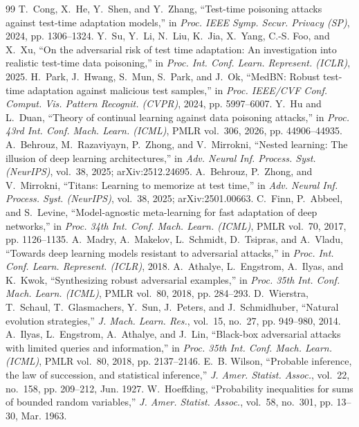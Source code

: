 \documentclass[journal]{IEEEtran}
\theoremstyle{remark}
\begin{document}
\begin{thebibliography}{99}
 T.~Cong, X.~He, Y.~Shen, and Y.~Zhang, ``Test-time poisoning attacks against test-time adaptation models,'' in \emph{Proc. IEEE Symp. Secur. Privacy (SP)}, 2024, pp. 1306--1324.
 Y.~Su, Y.~Li, N.~Liu, K.~Jia, X.~Yang, C.-S. Foo, and X.~Xu, ``On the adversarial risk of test time adaptation: An investigation into realistic test-time data poisoning,'' in \emph{Proc. Int. Conf. Learn. Represent. (ICLR)}, 2025.
 H.~Park, J.~Hwang, S.~Mun, S.~Park, and J.~Ok, ``MedBN: Robust test-time adaptation against malicious test samples,'' in \emph{Proc. IEEE/CVF Conf. Comput. Vis. Pattern Recognit. (CVPR)}, 2024, pp. 5997--6007.
 Y.~Hu and L.~Duan, ``Theory of continual learning against data poisoning attacks,'' in \emph{Proc. 43rd Int. Conf. Mach. Learn. (ICML)}, PMLR vol.~306, 2026, pp. 44906--44935.
 A.~Behrouz, M.~Razaviyayn, P.~Zhong, and V.~Mirrokni, ``Nested learning: The illusion of deep learning architectures,'' in \emph{Adv. Neural Inf. Process. Syst. (NeurIPS)}, vol.~38, 2025; arXiv:2512.24695.
 A.~Behrouz, P.~Zhong, and V.~Mirrokni, ``Titans: Learning to memorize at test time,'' in \emph{Adv. Neural Inf. Process. Syst. (NeurIPS)}, vol.~38, 2025; arXiv:2501.00663.
 C.~Finn, P.~Abbeel, and S.~Levine, ``Model-agnostic meta-learning for fast adaptation of deep networks,'' in \emph{Proc. 34th Int. Conf. Mach. Learn. (ICML)}, PMLR vol.~70, 2017, pp. 1126--1135.
 A.~Madry, A.~Makelov, L.~Schmidt, D.~Tsipras, and A.~Vladu, ``Towards deep learning models resistant to adversarial attacks,'' in \emph{Proc. Int. Conf. Learn. Represent. (ICLR)}, 2018.
 A.~Athalye, L.~Engstrom, A.~Ilyas, and K.~Kwok, ``Synthesizing robust adversarial examples,'' in \emph{Proc. 35th Int. Conf. Mach. Learn. (ICML)}, PMLR vol.~80, 2018, pp. 284--293.
 D.~Wierstra, T.~Schaul, T.~Glasmachers, Y.~Sun, J.~Peters, and J.~Schmidhuber, ``Natural evolution strategies,'' \emph{J. Mach. Learn. Res.}, vol.~15, no.~27, pp. 949--980, 2014.
 A.~Ilyas, L.~Engstrom, A.~Athalye, and J.~Lin, ``Black-box adversarial attacks with limited queries and information,'' in \emph{Proc. 35th Int. Conf. Mach. Learn. (ICML)}, PMLR vol.~80, 2018, pp. 2137--2146.
 E.~B. Wilson, ``Probable inference, the law of succession, and statistical inference,'' \emph{J. Amer. Statist. Assoc.}, vol.~22, no.~158, pp. 209--212, Jun. 1927.
 W.~Hoeffding, ``Probability inequalities for sums of bounded random variables,'' \emph{J. Amer. Statist. Assoc.}, vol.~58, no.~301, pp. 13--30, Mar. 1963.

\end{thebibliography}
\end{document}
